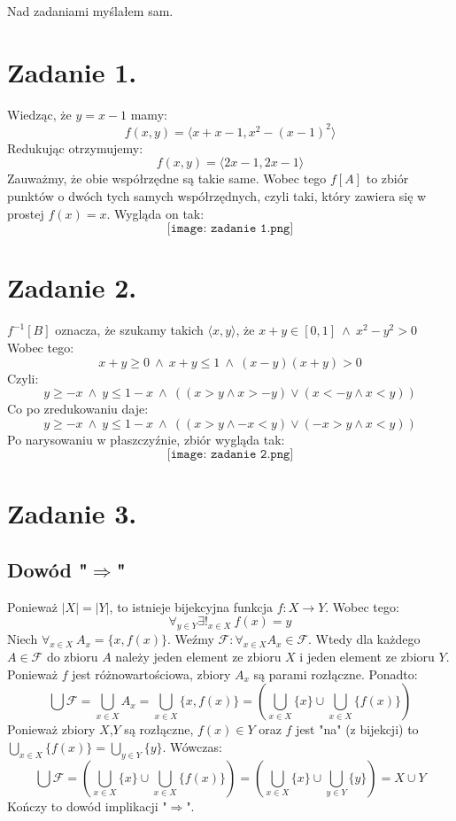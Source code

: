 \documentclass{article}
\begin{document}
\newcommand{\imp}{\Rightarrow}
\newcommand{\lub}{\vee}
\newcommand{\roz}{\setminus}
\newcommand{\zbp}{\emptyset}
\newcommand{\zbpot}{\mathcal{P}}
\newcommand{\troj}{\bigtriangleup}
\newcommand{\nat}{\mathbb{N}}
\newcommand{\calk}{\mathbb{Z}}
\newcommand{\rze}{\mathbb{R}}
\newcommand{\wegde}{\wedge}
\newcommand{\eps}{\varepsilon}
\maketitle
Nad zadaniami myślałem sam.
\section*{Zadanie 1.}
Wiedząc, że $y=x-1$ mamy: 
\[f(x,y) = \langle x + x - 1, x^2 - (x-1)^2\rangle\]
Redukując otrzymujemy:
\[f(x,y) = \langle 2x - 1, 2x - 1\rangle\]
Zauważmy, że obie współrzędne są takie same. Wobec tego $f[A]$ to zbiór punktów o dwóch tych samych współrzędnych, czyli taki, który zawiera się w prostej $f(x)=x$. Wygląda on tak:
\[\texttt{[image: zadanie 1.png]}\]


\section*{Zadanie 2.}

$f^{-1}[B]$ oznacza, że szukamy takich $\langle x,y\rangle$, że $x+y \in [0,1]\ \wedge \ x^2 - y^2 >0 $ Wobec tego:
\[x+y \geq 0 \ \wegde \ x + y \leq 1 \ \wegde  \ (x-y)(x+y) >0 \]
Czyli:
\[ y\geq -x \ \wegde \ y \leq 1-x \ \wegde \ ((x>y \wegde x > -y)  \lub (x<-y \wedge x<y)) \]
Co po zredukowaniu daje:
\[ y\geq -x \ \wegde \ y \leq 1-x \ \wegde \ ((x>y \wegde -x < y)  \lub (-x>y \wedge x<y)) \]
Po narysowaniu w płaszczyźnie, zbiór wygląda tak:
\[\texttt{[image: zadanie 2.png]}\]


\section*{Zadanie 3.}

\subsection*{Dowód "$\Rightarrow$"}
Ponieważ $|X| = |Y|$, to istnieje bijekcyjna funkcja $f: X \rightarrow Y$. Wobec tego:
\[\forall_{y \in Y} \exists!_{x \in X} \ f(x) = y \]
Niech $\forall_{x \in X} \ A_x = \{ x,f(x)\} $. Weźmy $\mathcal{F}: \forall_{x \in X} A_x \in \mathcal{F} $. Wtedy dla każdego $A \in \mathcal{F}$ do zbioru $A$ należy jeden element ze zbioru $X$ i jeden element ze zbioru $Y$. Ponieważ $f$ jest różnowartościowa, zbiory $A_x$ są parami rozłączne. Ponadto: 
\[\bigcup \mathcal{F} = \bigcup_{x\in X} A_x= \bigcup_{x\in X} \{x,f(x)\} =  (\bigcup_{x\in X} \{x\} \cup \bigcup_{x\in X} \{f(x)\}) \]
Ponieważ zbiory $X$,$Y$ są rozłączne, $f(x) \in Y$ oraz $f$ jest "na" (z bijekcji) to $\bigcup_{x\in X} \{f(x)\} = \bigcup_{y\in Y} \{y\}$.  Wówczas:
\[ \bigcup \mathcal{F} = (\bigcup_{x\in X} \{x\} \cup \bigcup_{x\in X} \{f(x)\})= (\bigcup_{x\in X} \{x\} \cup \bigcup_{y\in Y} \{y\}) = X\cup Y\]
Kończy to dowód implikacji "$\Rightarrow$". 
\end{document}
